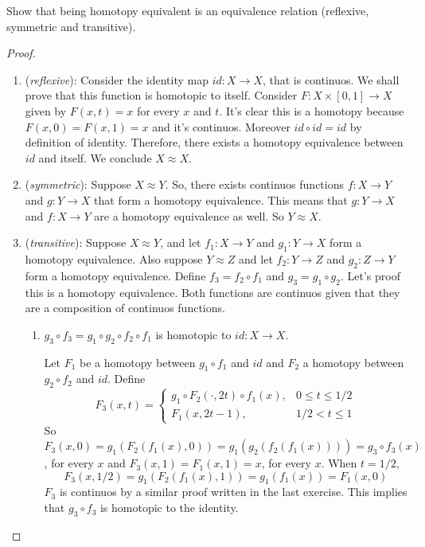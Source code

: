 \noindent\linia

\begin{exercise}
    Show that being homotopy equivalent is an equivalence relation (reflexive,
    symmetric and transitive).
\end{exercise}

\begin{proof}

\begin{enumerate}
    \item (\textit{reflexive}): Consider the identity map $id: X \to X$,
    that is continuos.
    We shall prove that this function is homotopic to itself. Consider $F : X
    \times [0,1] \to X$ given by $F(x,t) = x$ for every $x$ and $t$. It's
    clear this is a homotopy because $F(x,0) = F(x,1) = x$ and it's continuos. Moreover
    $id \circ id = id$ by definition of identity. Therefore, there exists a
    homotopy equivalence between $id$ and itself. We conclude $X \approx X$.  

    \item (\textit{symmetric}): Suppose $X \approx Y$. So, there exists
    continuos functions $f: X \to Y$ and $g: Y \to X$ that form a homotopy
    equivalence. This means that $g: Y \to X$ and $f: X \to Y$ are a homotopy
    equivalence as well. So $Y \approx X$.

    \item (\textit{transitive}): Suppose $X \approx Y$, and let $f_1 : X \to
    Y$ and $g_1: Y \to X$
    form a homotopy equivalence. Also suppose $Y \approx Z$ and
    let $f_2: Y \to Z$ and $g_2: Z \to Y$ form a homotopy equivalence.
    Define $f_3 = f_2 \circ f_1$ and $g_3 = g_1 \circ g_2$. Let's proof this
    is a homotopy equivalence. Both functions are continuos given that they
    are a composition of continuos functions. 

    \begin{enumerate}
        \item $g_3 \circ f_3 = g_1 \circ g_2 \circ f_2 \circ f_1$ is homotopic
        to $id: X \to X$.

        Let $F_1$ be a homotopy between $g_1 \circ f_1$ and $id$ and $F_2$ a
        homotopy between $g_2 \circ f_2$ and $id$. Define 
        $$
        F_3(x,t) = \begin{cases}
            g_1 \circ F_2(\cdot,2t)\circ f_1(x), &0 \le t \le 1/2 \\
            F_1(x, 2t - 1), &1/2 < t \le 1
        \end{cases}
        $$
        So $F_3(x,0) = g_1(F_2(f_1(x),0)) = g_1(g_2(f_2(f_1(x)))) = g_3 \circ
        f_3(x)$, for every $x$ and 
        $F_3(x,1) = F_1(x,1) = x$, for every $x$. When $t = 1/2$, 
        $$F_3(x, 1/2) = g_1(F_2(f_1(x), 1)) = g_1(f_1(x)) = F_1(x,0)$$
        $F_3$ is continuos by a similar proof written in the last exercise. 
        This implies that $g_3\circ f_3$ is homotopic to the identity.


\end{enumerate}
\end{enumerate}
\end{proof}
